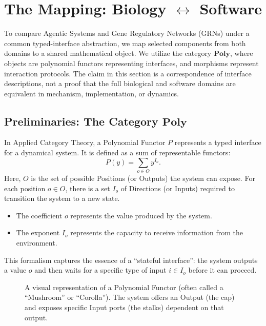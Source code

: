 \section{The Mapping: Biology $\leftrightarrow$ Software}

To compare Agentic Systems and Gene Regulatory Networks (GRNs) under a common typed-interface
abstraction, we map selected components from both domains to a shared mathematical object. We
utilize the category $\mathbf{Poly}$, where objects are polynomial functors representing interfaces, and
morphisms represent interaction protocols. The claim in this section is a correspondence of interface
descriptions, not a proof that the full biological and software domains are equivalent in mechanism,
implementation, or dynamics.

\subsection{Preliminaries: The Category $\mathbf{Poly}$}

In Applied Category Theory, a Polynomial Functor $P$ represents a typed interface for a dynamical system. It is
defined as a sum of representable functors:
\begin{equation}
P(y) = \sum_{o\in O} y^{I_o}.
\label{eq:poly-functor}
\end{equation}
Here, $O$ is the set of possible Positions (or Outputs) the system can expose. For each position $o\in O$, there
is a set $I_o$ of Directions (or Inputs) required to transition the system to a new state.
\begin{itemize}[leftmargin=*]
\item The coefficient $o$ represents the value produced by the system.
\item The exponent $I_o$ represents the capacity to receive information from the environment.
\end{itemize}
This formalism captures the essence of a ``stateful interface'': the system outputs a value $o$ and then waits
for a specific type of input $i\in I_o$ before it can proceed.

\begin{figure}[h]
\centering
{}
\caption{A visual representation of a Polynomial Functor (often called a ``Mushroom'' or ``Corolla''). The system
offers an Output (the cap) and exposes specific Input ports (the stalks) dependent on that output.}
\end{figure}

